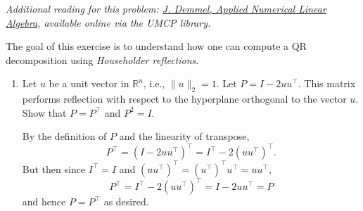 \documentclass{../../../kin_math}
\begin{document}
\begin{questions}
  \question \emph{Additional reading for this problem: \href{https://www.stat.uchicago.edu/~lekheng/courses/302/demmel/}{J. Demmel, Applied Numerical Linear Algebra}, available online via the UMCP library.}

  The goal of this exercise is to understand how one can compute a QR decomposition using \emph{Householder reflections}.
  \begin{enumerate}
    \item Let $u$ be a unit vector in $\mathbb{R}^n$, i.e., $\lVert u \rVert_2 = 1$. Let $P = I - 2uu^\top$. This matrix performs reflection with respect to the hyperplane orthogonal to the vector $u$. Show that $P = P^\top$ and $P^2 = I$.
    \begin{solution}
      By the definition of $P$ and the linearity of transpose,
      \begin{equation*}
        P^\top = (I - 2uu^\top)^\top = I^\top - 2(uu^\top)^\top.
      \end{equation*}
      But then since $I^\top = I$ and $(uu^\top)^\top = (u^\top)^\top u^\top = uu^\top$,
      \begin{equation*}
        P^\top = I^\top - 2(uu^\top)^\top = I - 2uu^\top = P
      \end{equation*}
      and hence $P = P^\top$ as desired.


\end{solution}
\end{enumerate}
\end{questions}
\end{document}
